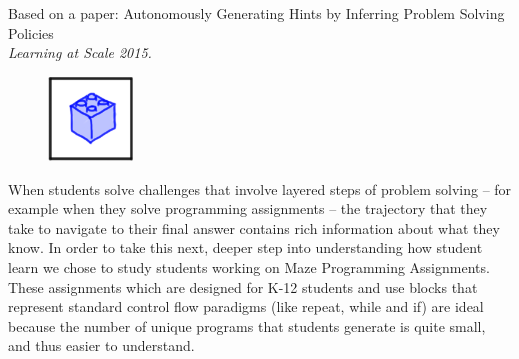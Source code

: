 Based on a paper: Autonomously Generating Hints by Inferring Problem
Solving Policies \cite{piech2015autonomously} \\ \emph{Learning at Scale 2015.}

\vspace{7mm}

\begin{figure}[h!]
\includegraphics[width=0.2\textwidth]{img/assnType_2}
\end{figure}

\vspace{7mm}

When students solve challenges that involve layered steps of problem solving -- for example when they solve programming assignments -- the trajectory that they take to navigate to their final answer contains rich information about what they know. In order to take this next, deeper step into understanding how student learn we chose to study students working on Maze Programming Assignments. These assignments which are designed for K-12 students and use blocks that represent standard control flow paradigms (like repeat, while and if) are ideal because the number of unique programs that students generate is quite small, and thus easier to understand.


